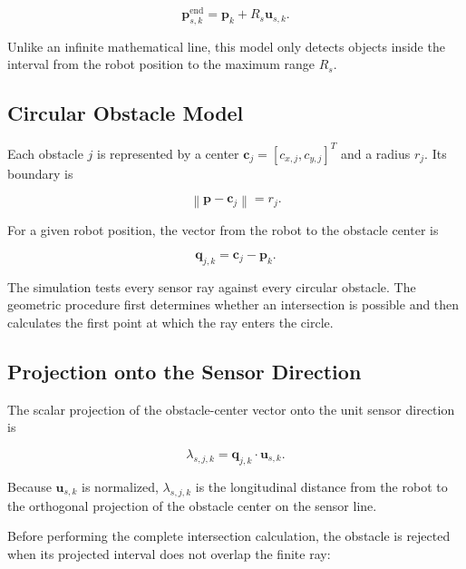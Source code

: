 \documentclass[10pt,twocolumn,a4paper]{article}
\begin{document}
\begin{equation}
    \mathbf{p}^{\mathrm{end}}_{s,k}
    =
    \mathbf{p}_k+R_s\mathbf{u}_{s,k}.
    \label{eq:sensor_endpoint}
\end{equation}

Unlike an infinite mathematical line, this model only detects objects
inside the interval from the robot position to the maximum range $R_s$.

\subsection{Circular Obstacle Model}

Each obstacle $j$ is represented by a center
$\mathbf{c}_j=[c_{x,j},c_{y,j}]^T$ and a radius $r_j$. Its boundary is

\begin{equation}
    \left\|\mathbf{p}-\mathbf{c}_j\right\|=r_j.
    \label{eq:circular_obstacle}
\end{equation}

For a given robot position, the vector from the robot to the obstacle
center is

\begin{equation}
    \mathbf{q}_{j,k}=\mathbf{c}_j-\mathbf{p}_k.
    \label{eq:robot_to_obstacle}
\end{equation}

The simulation tests every sensor ray against every circular obstacle.
The geometric procedure first determines whether an intersection is
possible and then calculates the first point at which the ray enters the
circle.

\subsection{Projection onto the Sensor Direction}

The scalar projection of the obstacle-center vector onto the unit sensor
direction is

\begin{equation}
    \lambda_{s,j,k}
    =
    \mathbf{q}_{j,k}\cdot\mathbf{u}_{s,k}.
    \label{eq:projection}
\end{equation}

Because $\mathbf{u}_{s,k}$ is normalized, $\lambda_{s,j,k}$ is the
longitudinal distance from the robot to the orthogonal projection of the
obstacle center on the sensor line.

Before performing the complete intersection calculation, the obstacle
is rejected when its projected interval does not overlap the finite ray:
\end{document}
